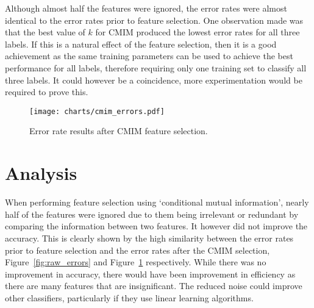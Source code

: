 Although almost half the features were ignored, the error rates were almost identical to the error rates prior to feature
selection. One observation made was that the best value of $k$ for CMIM produced the lowest error rates for all three labels.
If this is a natural effect of the feature selection, then it is a good achievement as the same training parameters can be used
to achieve the best performance for all labels, therefore requiring only one training set to classify all three labels. It could
however be a coincidence, more experimentation would be required to prove this.

\begin{figure}[h]
    \centering
    \texttt{[image: charts/cmim\_errors.pdf]}
    \caption{Error rate results after CMIM feature selection.}
    \label{fig:cmim_errors}
\end{figure}

\section{Analysis}
\todo{}

When performing feature selection using `conditional mutual information', nearly half of the features were ignored due to them
being irrelevant or redundant by comparing the information between two features. It however did not improve the accuracy. This
is clearly shown by the high similarity between the error rates prior to feature selection and the error rates after the CMIM
selection, Figure~\ref{fig:raw_errors} and Figure~\ref{fig:cmim_errors} respectively. While there was no improvement in
accuracy, there would have been improvement in efficiency as there are many features that are insignificant. The reduced noise
could improve other classifiers, particularly if they use linear learning algorithms.

\par
\cite{redundant_feature_elimination}
\cite{mltechniques_spamfiltering}


